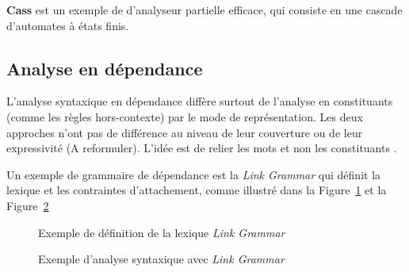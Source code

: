 \textbf{Cass} est un exemple de d'analyseur partielle efficace, qui consiste en une cascade d'automates à états finis.

\subsection{Analyse en dépendance}
L’analyse syntaxique en dépendance diffère surtout de l’analyse en constituants (comme les règles hors-contexte) par le mode de représentation. Les deux approches n’ont pas de différence au niveau de leur couverture ou de leur expressivité (A reformuler). L'idée est de relier les mots et non les constituants \citep{automatic-nlp}.

Un exemple de grammaire de dépendance est la \emph{Link Grammar} qui définit la lexique et les contraintes d'attachement, comme illustré dans la Figure~\ref{fig:link-grammar} et la Figure~\ref{fig:link-grammar-syntax}

\begin{figure}[htbp]
    \begin{center}
    \end{center}
    \caption{Exemple de définition de la lexique \emph{Link Grammar} \citep{automatic-nlp}}
    \label{fig:link-grammar}
\end{figure}

\begin{figure}[htbp]
    \begin{center}
    \end{center}
    \caption{Exemple d'analyse syntaxique avec \emph{Link Grammar} \citep{automatic-nlp}}
    \label{fig:link-grammar-syntax}
\end{figure}

